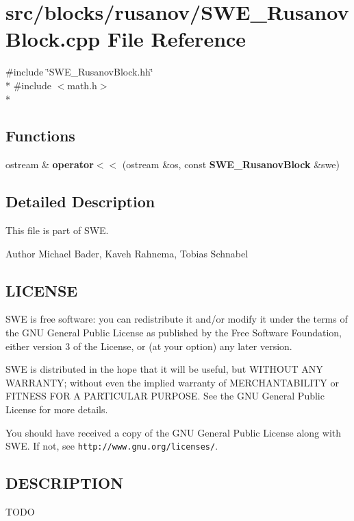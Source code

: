 \section{src/blocks/rusanov/\-S\-W\-E\-\_\-\-Rusanov\-Block.cpp File Reference}
\label{SWE__RusanovBlock_8cpp}
{\ttfamily \#include \char`\"{}S\-W\-E\-\_\-\-Rusanov\-Block.\-hh\char`\"{}}\\*
{\ttfamily \#include $<$math.\-h$>$}\\*
\subsection*{Functions}
\begin{DoxyCompactItemize}
\item 
ostream \& {\bf operator$<$$<$} (ostream \&os, const {\bf S\-W\-E\-\_\-\-Rusanov\-Block} \&swe)
\end{DoxyCompactItemize}


\subsection{Detailed Description}
This file is part of S\-W\-E.

\begin{DoxyAuthor}{Author}
Michael Bader, Kaveh Rahnema, Tobias Schnabel
\end{DoxyAuthor}
\subsection{L\-I\-C\-E\-N\-S\-E}\label{Writer_8hh_LICENSE}
S\-W\-E is free software\-: you can redistribute it and/or modify it under the terms of the G\-N\-U General Public License as published by the Free Software Foundation, either version 3 of the License, or (at your option) any later version.

S\-W\-E is distributed in the hope that it will be useful, but W\-I\-T\-H\-O\-U\-T A\-N\-Y W\-A\-R\-R\-A\-N\-T\-Y; without even the implied warranty of M\-E\-R\-C\-H\-A\-N\-T\-A\-B\-I\-L\-I\-T\-Y or F\-I\-T\-N\-E\-S\-S F\-O\-R A P\-A\-R\-T\-I\-C\-U\-L\-A\-R P\-U\-R\-P\-O\-S\-E. See the G\-N\-U General Public License for more details.

You should have received a copy of the G\-N\-U General Public License along with S\-W\-E. If not, see {\tt http\-://www.\-gnu.\-org/licenses/}.\subsection{D\-E\-S\-C\-R\-I\-P\-T\-I\-O\-N}\label{NetCdfWriter_8hh_DESCRIPTION}
T\-O\-D\-O 

